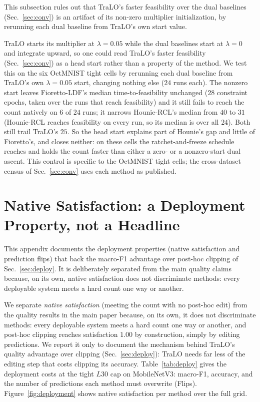 \documentclass[10pt]{article}
\begin{document}
This subsection rules out that TraLO's faster feasibility over the dual
baselines (Sec.~\ref{sec:conv}) is an artifact of its non-zero multiplier
initialization, by rerunning each dual baseline from TraLO's own start
value.

TraLO starts its multiplier at $\lambda{=}0.05$ while the dual
baselines start at $\lambda{=}0$ and integrate upward, so one could
read TraLO's faster feasibility (Sec.~\ref{sec:conv}) as a head start
rather than a property of the method. We test this on the six OctMNIST
tight cells by rerunning each dual baseline from TraLO's own
$\lambda{=}0.05$ start, changing nothing else ($24$ runs each). The
nonzero start leaves Fioretto-LDF's median time-to-feasibility
unchanged ($28$ constraint epochs, taken over the runs that reach
feasibility) and it still fails to reach the count natively on $6$ of
$24$ runs; it narrows Hounie-RCL's median from $40$ to $31$
(Hounie-RCL reaches feasibility on every run, so its median is over
all $24$). Both still trail TraLO's $25$. So the head start explains
part of Hounie's gap and little of Fioretto's, and closes neither: on
these cells the ratchet-and-freeze schedule reaches and holds the
count faster than either a zero- or a nonzero-start dual ascent. This
control is specific to the OctMNIST tight cells; the cross-dataset
census of Sec.~\ref{sec:conv} uses each method as published.



\section{Native Satisfaction: a Deployment Property, not a Headline}
\label{app:deploy}

This appendix documents the deployment properties (native satisfaction
and prediction flips) that back the macro-F1 advantage over post-hoc
clipping of Sec.~\ref{sec:deploy}. It is deliberately separated from the
main quality claims because, on its own, native satisfaction does not
discriminate methods: every deployable system meets a hard count one
way or another.



We separate \emph{native satisfaction} (meeting the count with no
post-hoc edit) from the quality results in the main paper because, on
its own, it does not discriminate methods: every deployable system meets
a hard count one way or another, and post-hoc clipping reaches
satisfaction $1.00$ by construction, simply by editing predictions. We
report it only to document the mechanism behind TraLO's quality
advantage over clipping (Sec.~\ref{sec:deploy}): {TraLO needs far less of the editing
step that costs clipping its accuracy.} Table~\ref{tab:deploy} gives the deployment costs
at the tight $L30$ cap on MobileNetV3: macro-F1, accuracy, and the
number of predictions each method must overwrite (Flips).
Figure~\ref{fig:deployment} shows native satisfaction per method over
the full grid.
\end{document}
